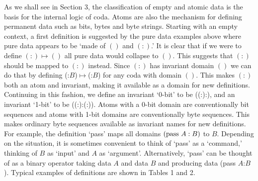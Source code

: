\documentclass[11pt]{article}
\begin{document}
    As we shall see in Section 3, the classification of empty and atomic data is the basis for the internal logic of coda.
Atoms are also the mechanism for defining permanent data such as bits, bytes and byte strings.
Starting with an empty context, a first definition is suggested by the pure data examples above where pure data
appears to be `made of $()$ and $(:)$.'
It is clear that if we were to define $(:)\mapsto()$ all pure data would collapse to $()$.  This suggests that $(:)$ should be
mapped to $(:)$ instead.  Since $(:)$ has invariant domain $()$ we can do that by defining (:$B$)$\mapsto$(:$B$) for any coda with
domain $()$.  This makes $(:)$ both an atom and invariant, making it available as a domain for new definitions.
Continuing in this fashion, we define an invariant `0-bit' to be ((:):), and an invariant `1-bit' to be ((:):(:)).
Atoms with a 0-bit domain are conventionally bit sequences and atoms with 1-bit domains are conventionally byte sequences.
This makes ordinary byte sequences available as invariant names for new definitions.  For example, the definition `pass' maps
all domains $({\rm pass}\ A:B)$ to $B$.  Depending on the situation,
it is sometimes convenient to think of `pass' as a `command,' thinking of $B$ as
`input' and $A$ as `argument'.  Alternatively, `pass' can be thought of as a binary operator taking data $A$ and data $B$ and producing data (pass $A$:$B$).
Typical examples of definitions are shown in Tables 1 and 2.
\end{document}
